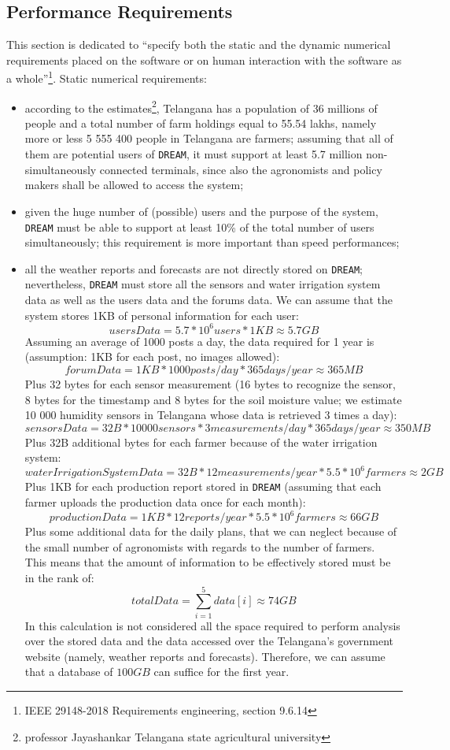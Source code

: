 \documentclass{article}
\begin{document}
\subsection{Performance Requirements}
This section is dedicated to “specify both the static and the dynamic numerical requirements placed on the software or on human interaction with the software as a whole”\footnote{IEEE 29148-2018 Requirements engineering, section 9.6.14}.
Static numerical requirements:
\begin{itemize}
\item according to the estimates\footnote{professor Jayashankar Telangana state agricultural university}, Telangana has a population of 36 millions of people and a total number of farm holdings equal to 55.54 lakhs, namely more or less 5 555 400 people in Telangana are farmers; assuming that all of them are potential users of \verb|DREAM|, it must support at least 5.7 million non-simultaneously connected terminals, since also the agronomists and policy makers shall be allowed to access the system;
\item given the huge number of (possible) users and the purpose of the system, \verb|DREAM| must be able to support at least 10\% of the total number of users simultaneously; this requirement is more important than speed performances;
\item all the weather reports and forecasts are not directly stored on \verb|DREAM|; nevertheless, \verb|DREAM| must store all the sensors and water irrigation system data as well as the users data and the forums data. 
We can assume that the system stores 1KB of personal information for each user:
\[ usersData = 5.7 * 10^6 users * 1 KB \approx 5.7 GB \]
Assuming an average of 1000 posts a day, the data required for 1 year is (assumption: 1KB for each post, no images allowed):
\[forumData = 1 KB * 1000 posts/day * 365 days/year \approx 365 MB \]
Plus 32 bytes for each sensor measurement (16 bytes to recognize the sensor, 8 bytes for the timestamp and 8 bytes for the soil moisture value; we estimate 10 000 humidity sensors in Telangana whose data is retrieved 3 times a day):
\[sensorsData = 32 B * 10 000 sensors * 3 measurements/day * 365 days/year \approx 350 MB \]
Plus 32B additional bytes for each farmer because of the water irrigation system:
\[waterIrrigationSystemData = 32 B * 12 measurements/year * 5.5 * 10^6 farmers \approx 2 GB \]
Plus 1KB for each production report stored in \verb|DREAM| (assuming that each farmer uploads the production data once for each month):
\[productionData = 1 KB * 12 reports/year * 5.5 * 10^6 farmers \approx 66 GB \]
Plus some additional data for the daily plans, that we can neglect because of the small number of agronomists with regards to the number of farmers.\\
This means that the amount of information to be effectively stored must be in the rank of:
\[totalData = \sum_{i=1}^{5} data[i] \approx 74 GB \]
In this calculation is not considered all the space required to perform analysis over the stored data and the data accessed over the Telangana's government website (namely, weather reports and forecasts). Therefore, we can assume that a database of $100 GB$ can suffice for the first year.
\end{itemize}
\end{document}
